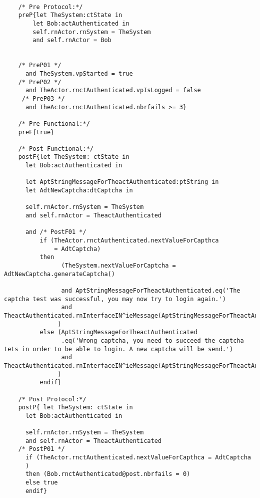 	\scriptsize
	\vspace{0.5cm}
	\begin{lstlisting}[style=MessirStyle,firstnumber=auto,captionpos=b,caption={\msrmessir (MCL-oriented) specification of the operation \emph{oeFillCaptcha}.},label=OM-actAuthenticated-oeFillCaptcha-MCL-LST]

	/* Pre Protocol:*/ 
	preP{let TheSystem:ctState in
		let Bob:actAuthenticated in
		self.rnActor.rnSystem = TheSystem
		and self.rnActor = Bob
		
		
	/* PreP01 */
	  and TheSystem.vpStarted = true
	/* PreP02 */
	  and TheActor.rnctAuthenticated.vpIsLogged = false
	 /* PreP03 */
	  and TheActor.rnctAuthenticated.nbrfails >= 3}
	
	/* Pre Functional:*/
	preF{true}
	
	/* Post Functional:*/ 
	postF{let TheSystem: ctState in
	  let Bob:actAuthenticated in
		
	  let AptStringMessageForTheactAuthenticated:ptString in
	  let AdtNewCaptcha:dtCaptcha in
	  
	  self.rnActor.rnSystem = TheSystem
	  and self.rnActor = TheactAuthenticated
	  
	  and /* PostF01 */
	      if (TheActor.rnctAuthenticated.nextValueForCapthca
	          = AdtCaptcha)
	      then 
	      		(TheSystem.nextValueForCaptcha = AdtNewCaptcha.generateCaptcha()
	      			
	      		and AptStringMessageForTheactAuthenticated.eq('The captcha test was successful, you may now try to login again.')
	            and TheactAuthenticated.rnInterfaceIN^ieMessage(AptStringMessageForTheactAuthenticated)           
	           )
	      else (AptStringMessageForTheactAuthenticated
	            .eq('Wrong captcha, you need to succeed the captcha tets in order to be able to login. A new captcha will be send.')
	            and TheactAuthenticated.rnInterfaceIN^ieMessage(AptStringMessageForTheactAuthenticated)
	           )
	      endif}
	
	/* Post Protocol:*/ 
	postP{ let TheSystem: ctState in
	  let Bob:actAuthenticated in
	
	  self.rnActor.rnSystem = TheSystem
	  and self.rnActor = TheactAuthenticated
	/* PostP01 */
	  if (TheActor.rnctAuthenticated.nextValueForCapthca = AdtCaptcha 	
	  )
	  then (Bob.rnctAuthenticated@post.nbrfails = 0)
	  else true
	  endif}
	
	\end{lstlisting}
	\normalsize 
	
	
	
	





